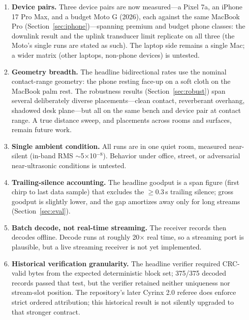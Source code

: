 \documentclass[11pt]{article}
\begin{document}
\begin{enumerate}
  \item \textbf{Device pairs.} Three device pairs are now measured---a
        Pixel 7a, an iPhone 17 Pro Max, and a budget Moto G (2026), each
        against the same MacBook Pro (Section~\ref{sec:iphone})---spanning
        premium and budget phone classes: the downlink result and the
        uplink transducer limit replicate on all three (the Moto's single
        runs are stated as such). The laptop side remains a single Mac; a
        wider matrix (other laptops, non-phone devices) is untested.
  \item \textbf{Geometry breadth.} The headline bidirectional rates use the
        nominal contact-range geometry: the phone resting face-up on a soft
        cloth on the MacBook palm rest. The robustness results
        (Section~\ref{sec:robust}) span several deliberately diverse
        placements---clean contact, reverberant overhang, shadowed desk
        plane---but all on the same bench and device pair at contact range. A
        true distance sweep, and placements across rooms and surfaces, remain
        future work.
  \item \textbf{Single ambient condition.} All runs are in one quiet room,
        measured near-silent (in-band RMS $\sim$5$\times$10$^{-8}$). Behavior
        under office, street, or adversarial near-ultrasonic conditions is
        untested.
  \item \textbf{Trailing-silence accounting.} The headline goodput is a span
        figure (first chirp to last data sample) that excludes the
        $\geq$0.3\,s trailing silence; gross goodput is slightly lower, and the
        gap amortizes away only for long streams (Section~\ref{sec:eval}).
  \item \textbf{Batch decode, not real-time streaming.} The receiver records
        then decodes offline. Decode runs at roughly 20$\times$ real time, so a
        streaming port is plausible, but a live streaming receiver is not yet
        implemented.
  \item \textbf{Historical verification granularity.} The headline verifier
        required CRC-valid bytes from the expected deterministic block set;
        375/375 decoded records passed that test, but the verifier retained
        neither uniqueness nor stream-slot position.
        The repository's later Cyrinx 2.0 referee does enforce strict ordered
        attribution; this historical result is not silently upgraded to that
        stronger contract.
\end{enumerate}
\end{document}
